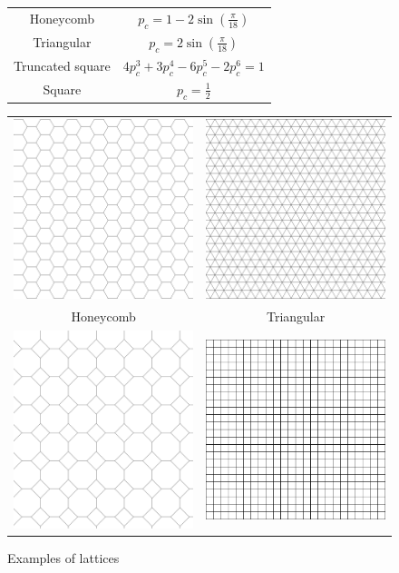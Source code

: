 \documentclass[a4paper,11pt]{article}
\theoremstyle{plain}
\theoremstyle{definition}
\theoremstyle{remark}
\begin{document}
\begin{figure}
\centering
\caption{Examples of lattices}
\begin{tabular}{cc}
  Honeycomb & $p_c = 1 - 2\sin(\frac{\pi}{18})$ \\
  Triangular & $p_c = 2\sin(\frac{\pi}{18})$ \\
  Truncated square & $4p_c^3+3p_c^4-6p_c^5-2p_c^6=1$ \\
  Square & $p_c = \frac{1}{2}$ \\
\end{tabular}
\begin{tabular}{cc}
  \includegraphics[width=55mm]{hexagon} & \includegraphics[width=55mm]{triangular} \\ Honeycomb
 & Triangular \\[6pt]
 \includegraphics[width=
 55mm]{truncated_square_lattice} & \includegraphics[width=55mm]{lattice} \\

\end{tabular}
\end{figure}
\end{document}
